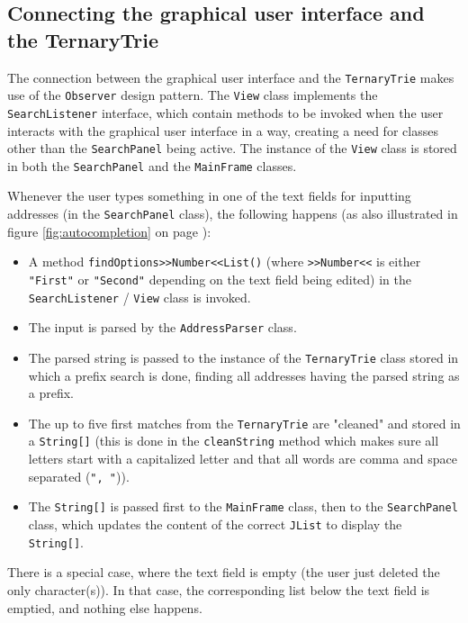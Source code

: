 \documentclass[a4paper,11pt]{article}
\begin{document}
\subsection{Connecting the graphical user interface and the TernaryTrie}
The connection between the graphical user interface and the \texttt{TernaryTrie} makes use of the \texttt{Observer} design pattern. The \texttt{View} class implements the \texttt{SearchListener} interface, which contain methods to be invoked when the user interacts with the graphical user interface in a way, creating a need for classes other than the \texttt{SearchPanel} being active. The instance of the \texttt{View} class is stored in both the \texttt{SearchPanel} and the \texttt{MainFrame} classes.

Whenever the user types something in one of the text fields for inputting addresses (in the \texttt{SearchPanel} class), the following happens (as also illustrated in figure \ref{fig:autocompletion} on page \pageref{fig:autocompletion}):
\begin{itemize}
	\item A method \texttt{findOptions>>Number<<List()} (where \texttt{>>Number<<} is either \texttt{"First"} or \texttt{"Second"} depending on the text field being edited) in the \texttt{SearchListener} / \texttt{View} class is invoked.
	\item The input is parsed by the \texttt{AddressParser} class.
	\item The parsed string is passed to the instance of the \texttt{TernaryTrie} class stored in which a prefix search is done, finding all addresses having the parsed string as a prefix.
	\item The up to five first matches from the \texttt{TernaryTrie} are "cleaned" and stored in a \texttt{String[]} (this is done in the \texttt{cleanString} method which makes sure all letters start with a capitalized letter and that all words are comma and space separated (\texttt{", "})).
	\item The \texttt{String[]} is passed first to the \texttt{MainFrame} class, then to the \texttt{SearchPanel} class, which updates the content of the correct \texttt{JList} to display the \texttt{String[]}.
\end{itemize}
There is a special case, where the text field is empty (the user just deleted the only character(s)). In that case, the corresponding list below the text field is emptied, and nothing else happens.
\end{document}
